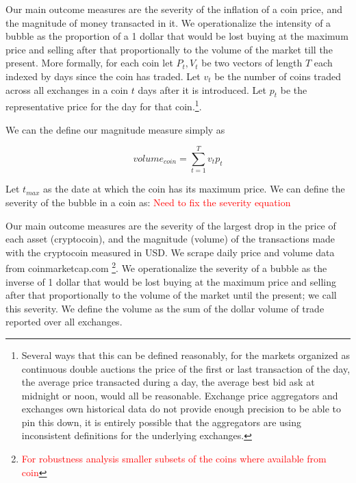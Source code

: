 Our main outcome measures are the severity of the inflation of a coin price, and the magnitude of money transacted in it.
We operationalize the intensity of a bubble as the proportion of a 1 dollar that would be lost buying at the maximum price and selling after that proportionally to the volume of the market till the present.
More formally, for each coin let $P_t,V_t$ be two vectors of length $T$ each indexed by days since the coin has traded.
Let $v_t$ be the number of coins traded across all exchanges in a coin $t$ days after it is introduced. 
Let $p_t$ be the representative price for the day for that coin.\footnote{ Several ways that this can be defined reasonably, for the markets organized as continuous double auctions the price of the first or last transaction of the day,  the average price transacted during a day, the average best bid ask at midnight or noon, would all be reasonable. Exchange price aggregators and exchanges own historical data do not provide enough precision to be able to pin this down, it is entirely possible that the aggregators are using inconsistent definitions for the underlying exchanges.   }. 

We can the define our magnitude measure simply as

\begin{equation}
volume_{coin} = \sum_{t=1}^{T} v_t  p_t
\end{equation}

Let $t_{max}$ as the date at which the coin has its maximum price.  
We can define the severity of the bubble in a coin as: \textcolor{red}{Need to fix the severity equation}

Our main outcome measures are the severity of the largest drop in the price of each asset (cryptocoin), and the magnitude (volume) of the transactions made with the cryptocoin measured in USD.
We scrape daily price and volume data from coinmarketcap.com \footnote{\textcolor{red}{For robustness analysis smaller subsets of the coins where available from coin}}.
We operationalize the severity of a bubble as the inverse of 1 dollar that would be lost buying at the maximum price and selling after that proportionally to the volume of the market until the present; we call this severity.
We define the volume as the sum of the dollar volume of trade reported over all exchanges.